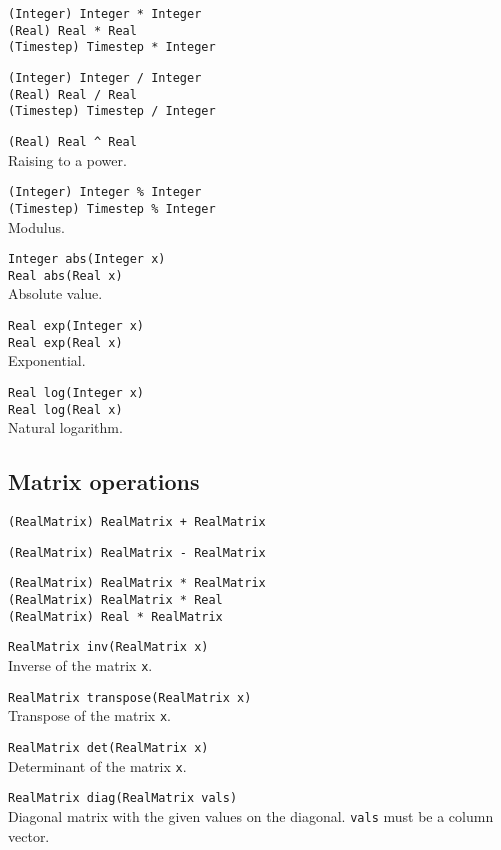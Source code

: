 \verb|(Integer) Integer * Integer| \\
\verb|(Real) Real * Real| \\
\verb|(Timestep) Timestep * Integer|

\verb|(Integer) Integer / Integer| \\
\verb|(Real) Real / Real| \\
\verb|(Timestep) Timestep / Integer|

\verb|(Real) Real ^ Real| \\
Raising to a power.

\verb|(Integer) Integer % Integer| \\
\verb|(Timestep) Timestep % Integer| \\
Modulus.

\verb|Integer abs(Integer x)| \\
\verb|Real abs(Real x)| \\
Absolute value.

\verb|Real exp(Integer x)| \\
\verb|Real exp(Real x)| \\
Exponential.

\verb|Real log(Integer x)| \\
\verb|Real log(Real x)| \\
Natural logarithm.


\subsection{Matrix operations}
\label{sec:builtin-matrix-ops}

\verb|(RealMatrix) RealMatrix + RealMatrix|

\verb|(RealMatrix) RealMatrix - RealMatrix|

\verb|(RealMatrix) RealMatrix * RealMatrix| \\
\verb|(RealMatrix) RealMatrix * Real| \\
\verb|(RealMatrix) Real * RealMatrix|

\verb|RealMatrix inv(RealMatrix x)| \\
Inverse of the matrix \verb|x|.

\verb|RealMatrix transpose(RealMatrix x)| \\
Transpose of the matrix \verb|x|.

\verb|RealMatrix det(RealMatrix x)| \\
Determinant of the matrix \verb|x|.

\verb|RealMatrix diag(RealMatrix vals)| \\
Diagonal matrix with the given values on the diagonal. \verb|vals| must be a
column vector.

